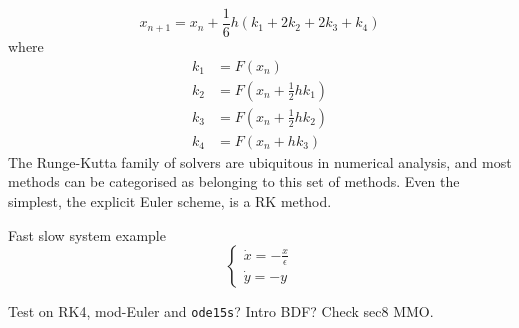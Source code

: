 $$ x_{n+1} = x_n +\frac{1}{6} h \left(k_1+2k_2+2k_3+k_4\right)$$
where
\begin{align*}
k_1 &= F(x_n)\\
k_2 &= F\left(x_n+\frac{1}{2}hk_1\right)\\
k_3 &= F\left(x_n +\frac{1}{2}hk_2\right)\\
k_4 &= F\left(x_n + hk_3\right)
\end{align*}
The Runge-Kutta family of solvers are ubiquitous in numerical analysis, and most methods can be categorised as belonging to this set of methods. Even the simplest, the explicit Euler scheme, is a RK method.

\begin{ex}
		Fast slow system example 
		$$\begin{cases}
		\dot{x}=-\frac{x}{\epsilon}\\
		\dot{y}=-y
		\end{cases}$$
		
		Test on RK4, mod-Euler and \texttt{ode15s}? Intro BDF? Check sec8 MMO.
\end{ex}
